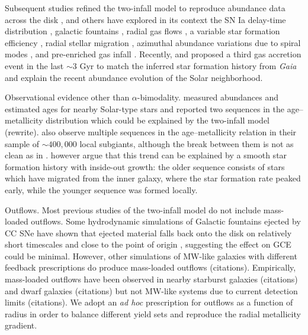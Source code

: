 \documentclass[twocolumn,twocolappendix,linenumbers]{aastex631}
\newcommand{\todo}[1]{{\color{red}#1}}
\begin{document}
Subsequent studies refined the two-infall model to reproduce abundance data across the disk \citep[e.g.,][]{chiappini_abundance_2001,chiappini_oxygen_2003}, and others have explored in its context the SN Ia delay-time distribution \citep{matteucci_effect_2009,palicio_analytic_2023}, galactic fountains \citep{spitoni_effects_2009}, radial gas flows \citep{spitoni_effects_2011,palla_chemical_2020}, a variable star formation efficiency \citep{spitoni_effects_2011,palla_chemical_2020}, radial stellar migration \citep{spitoni_effect_2015,palla_mgfe_2022}, azimuthal abundance variations due to spiral modes \citep{spitoni_2d_2019}, and pre-enriched gas infall \citep{palla_chemical_2020,spitoni_remind_2024}. Recently, \citet{spitoni_beyond_2023} and \citet{palla_mapping_2024} proposed a third gas accretion event in the last $\sim3$ Gyr to match the inferred star formation history from {\it Gaia} \citep{ruiz-lara_recurrent_2020} and explain the recent abundance evolution of the Solar neighborhood.

\todo{Observational evidence other than $\alpha$-bimodality.} \citet{nissen_high-precision_2020} measured abundances and estimated ages for nearby Solar-type stars and reported two sequences in the age--metallicity distribution which could be explained by the two-infall model \todo{(rewrite)}. \citet{nataf_accurate_2024} also observe multiple sequences in the age--metallicity relation in their sample of $\sim400,000$ local subgiants, although the break between them is not as clean as in \citet{nissen_high-precision_2020}. \citet{chen_recent_2025} however argue that this trend can be explained by a smooth star formation history with inside-out growth: the older sequence consists of stars which have migrated from the inner galaxy, where the star formation rate peaked early, while the younger sequence was formed locally. 

\todo{Outflows.} Most previous studies of the two-infall model do not include mass-loaded outflows. Some hydrodynamic simulations of Galactic fountains ejected by CC SNe have shown that ejected material falls back onto the disk on relatively short timescales \citep{spitoni_galactic_2008,spitoni_effects_2009} and close to the point of origin \citep{melioli_hydrodynamical_2008,melioli_hydrodynamical_2009}, suggesting the effect on GCE could be minimal. However, other simulations of MW-like galaxies with different feedback prescriptions do produce mass-loaded outflows \todo{(citations)}. Empirically, mass-loaded outflows have been observed in nearby starburst galaxies \todo{(citations)} and dwarf galaxies \todo{(citations)} but not MW-like systems due to current detection limits \todo{(citations)}. We adopt an {\it ad hoc} prescription for outflows as a function of radius in order to balance different yield sets and reproduce the radial metallicity gradient.
\end{document}
